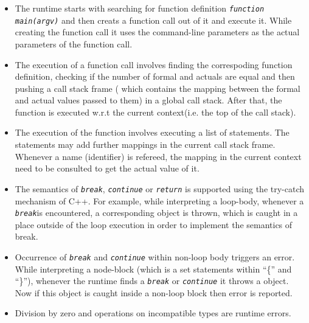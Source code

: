 \documentclass[12,twoside]{article}
\begin{document}
\begin{itemize}

  \item The runtime starts with searching for function definition
  {\tt\emph{function main(argv)}} and then creats a function call out of it and 
  execute it. 
  While creating the function call it uses the command-line parameters as the 
  actual parameters of the function call.

  \item The execution of a function call involves finding the correspoding 
  function definition, checking if the number of formal and actuals are equal 
  and then pushing a call stack frame ( which contains the mapping between the formal 
  and actual values passed to them) in a global call stack. After that, the function
  is executed w.r.t the current context(i.e. the top of the call stack).

  \item The execution of the function involves executing a list of statements.
  The statements may add further mappings in the current call stack frame.
  Whenever a name (identifier) is refereed, the mapping in the current context 
  need to be consulted to get the actual value of it. 

  \item The semantics of {\tt\emph{break}}, {\tt\emph{continue}} or 
  {\tt\emph{return}} is supported using the try-catch mechanism of C++.
  For example, while interpreting a loop-body, whenever a 
  {\tt\emph{break}}is encountered, a corresponding object is thrown, which 
  is caught in a place outside of the loop execution in order to implement 
    the semantics of break. 
  
  \item Occurrence of {\tt\emph{break}} and {\tt\emph{continue}} within non-loop
    body triggers an error. While interpreting a node-block (which is a set statements within ``\{'' 
        and ``\}''), whenever the runtime finds a {\tt\emph{break}} or  
   {\tt\emph{continue}} it throws a object. Now if this object is caught
  inside a non-loop block then error is reported.

  \item Division by zero and operations on incompatible types are runtime errors.  
\end{itemize}
\end{document}
